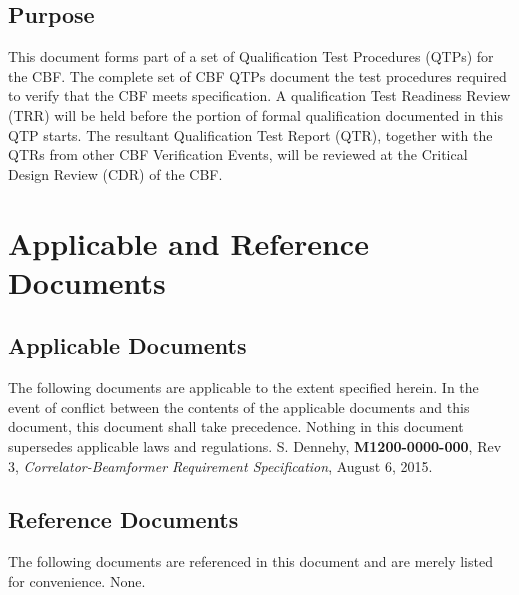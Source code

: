 \section{Purpose}
This document forms part of a set of Qualification Test Procedures (QTPs) for the CBF. The complete set of CBF QTPs document the test procedures required to verify that the CBF meets specification.
A qualification Test Readiness Review (TRR) will be held before the portion of formal qualification documented in this QTP starts.
The resultant Qualification Test Report (QTR), together with the QTRs from other CBF Verification Events, will be reviewed at the Critical Design Review (CDR) of the CBF.
\chapter{Applicable and Reference Documents}
\section{Applicable Documents}
The following documents are applicable to the extent specified herein. In the event of conflict between the contents of the applicable documents and this document, this document shall take precedence.  Nothing in this document supersedes applicable laws and regulations.
\newline\newline
[1]\hspace{10mm} S. Dennehy, {\bf M1200-0000-000}, Rev 3, {\it Correlator-Beamformer Requirement Specification}, August 6, 2015.
\section{Reference Documents}
The following documents are referenced in this document and are merely listed for convenience.\newline\newline
\hspace{10mm}None.
